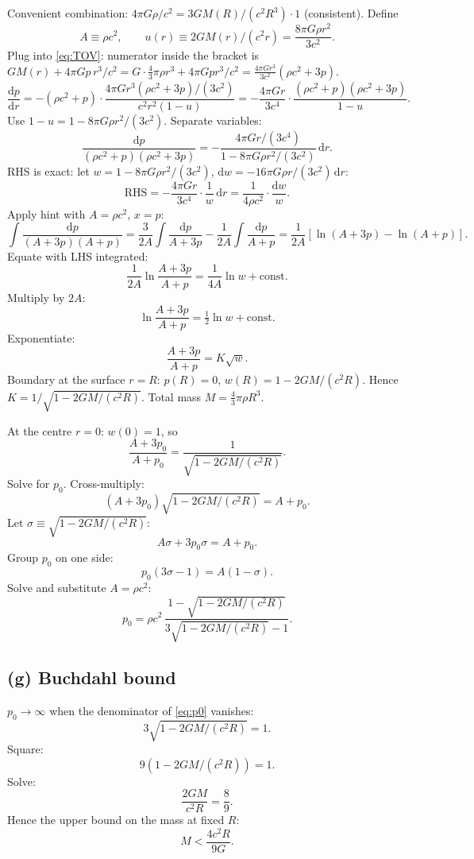 \documentclass[11pt]{article}
\newcommand{\de}{\mathrm{d}}
\begin{document}
Convenient combination: $4\pi G\rho/c^2 = 3 GM(R)/(c^2 R^3)\cdot 1$ (consistent). Define
\[
A \equiv \rho c^2,\qquad u(r) \equiv 2GM(r)/(c^2 r) = \frac{8\pi G\rho r^2}{3 c^2}.
\]
Plug into \eqref{eq:TOV}: numerator inside the bracket is $GM(r) + 4\pi G p\,r^3/c^2 = G\cdot\tfrac43\pi\rho r^3 + 4\pi G p r^3/c^2 = \tfrac{4\pi G r^3}{3 c^2}(\rho c^2 + 3p)$.
\[
\frac{\de p}{\de r} = -(\rho c^2 + p)\cdot\frac{4\pi G r^3(\rho c^2 + 3p)/(3 c^2)}{c^2 r^2(1 - u)} = -\frac{4\pi G r}{3 c^4}\cdot\frac{(\rho c^2+p)(\rho c^2 + 3p)}{1-u}.
\]
Use $1-u = 1 - 8\pi G\rho r^2/(3 c^2)$. Separate variables:
\[
\frac{\de p}{(\rho c^2 + p)(\rho c^2 + 3p)} = -\frac{4\pi G r/(3 c^4)}{1 - 8\pi G\rho r^2/(3 c^2)}\,\de r.
\]
RHS is exact: let $w = 1 - 8\pi G\rho r^2/(3 c^2)$, $\de w = -16\pi G\rho r/(3 c^2)\,\de r$:
\[
\text{RHS} = -\frac{4\pi G r}{3 c^4}\cdot\frac{1}{w}\,\de r = \frac{1}{4\rho c^2}\cdot\frac{\de w}{w}.
\]
Apply hint with $A = \rho c^2$, $x = p$:
\[
\int\frac{\de p}{(A+3p)(A+p)} = \frac{3}{2A}\!\int\frac{\de p}{A+3p} - \frac{1}{2A}\!\int\frac{\de p}{A+p} = \frac{1}{2A}\!\left[\ln(A+3p) - \ln(A+p)\right].
\]
Equate with LHS integrated:
\[
\frac{1}{2 A}\ln\!\frac{A+3p}{A+p} = \frac{1}{4 A}\ln w + \text{const}.
\]
Multiply by $2 A$:
\[
\ln\!\frac{A+3p}{A+p} = \tfrac12\ln w + \text{const}.
\]
Exponentiate:
\[
\frac{A+3p}{A+p} = K\sqrt{w}.
\]
Boundary at the surface $r=R$: $p(R) = 0$, $w(R) = 1 - 2GM/(c^2 R)$. Hence $K = 1/\sqrt{1-2GM/(c^2 R)}$. Total mass $M = \tfrac43\pi\rho R^3$.

At the centre $r = 0$: $w(0) = 1$, so
\[
\frac{A+3 p_0}{A + p_0} = \frac{1}{\sqrt{1-2GM/(c^2 R)}}.
\]
Solve for $p_0$. Cross-multiply:
\[
(A + 3 p_0)\sqrt{1-2GM/(c^2 R)} = A + p_0.
\]
Let $\sigma\equiv\sqrt{1-2GM/(c^2 R)}$:
\[
A\sigma + 3 p_0 \sigma = A + p_0.
\]
Group $p_0$ on one side:
\[
p_0(3\sigma - 1) = A(1 - \sigma).
\]
Solve and substitute $A = \rho c^2$:
\begin{equation}
\boxed{\;p_0 = \rho c^2\,\frac{1 - \sqrt{1 - 2GM/(c^2 R)}}{3\sqrt{1 - 2GM/(c^2 R)} - 1}.\;}
\label{eq:p0}
\end{equation}

\subsection*{(g) Buchdahl bound}

$p_0 \to \infty$ when the denominator of \eqref{eq:p0} vanishes:
\[
3\sqrt{1-2GM/(c^2 R)} = 1.
\]
Square:
\[
9(1-2GM/(c^2 R)) = 1.
\]
Solve:
\[
\frac{2GM}{c^2 R} = \frac{8}{9}.
\]
Hence the upper bound on the mass at fixed $R$:
\begin{equation}
\boxed{\;M < \frac{4 c^2 R}{9 G}.\;}
\label{eq:Buch}
\end{equation}
\end{document}
